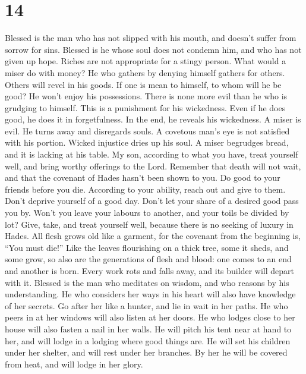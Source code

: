 \hypertarget{section-11}{%
\section{14}\label{section-11}}

 Blessed is the man who has not slipped with his mouth, and
doesn't suffer from sorrow for sins.  Blessed is he whose
soul does not condemn him, and who has not given up hope. 
Riches are not appropriate for a stingy person. What would a miser do
with money?  He who gathers by denying himself gathers for
others. Others will revel in his goods.  If one is mean to
himself, to whom will he be good? He won't enjoy his possessions.
 There is none more evil than he who is grudging to himself.
This is a punishment for his wickedness.  Even if he does
good, he does it in forgetfulness. In the end, he reveals his
wickedness.  A miser is evil. He turns away and disregards
souls.  A covetous man's eye is not satisfied with his
portion. Wicked injustice dries up his soul.  A miser
begrudges bread, and it is lacking at his table.  My son,
according to what you have, treat yourself well, and bring worthy
offerings to the Lord.  Remember that death will not wait,
and that the covenant of Hades hasn't been shown to you. 
Do good to your friends before you die. According to your ability, reach
out and give to them.  Don't deprive yourself of a good
day. Don't let your share of a desired good pass you by. 
Won't you leave your labours to another, and your toils be divided by
lot?  Give, take, and treat yourself well, because there is
no seeking of luxury in Hades.  All flesh grows old like a
garment, for the covenant from the beginning is, ``You must die!''
 Like the leaves flourishing on a thick tree, some it
sheds, and some grow, so also are the generations of flesh and blood:
one comes to an end and another is born.  Every work rots
and falls away, and its builder will depart with it. 
Blessed is the man who meditates on wisdom, and who reasons by his
understanding.  He who considers her ways in his heart will
also have knowledge of her secrets.  Go after her like a
hunter, and lie in wait in her paths.  He who peers in at
her windows will also listen at her doors.  He who lodges
close to her house will also fasten a nail in her walls. 
He will pitch his tent near at hand to her, and will lodge in a lodging
where good things are.  He will set his children under her
shelter, and will rest under her branches.  By her he will
be covered from heat, and will lodge in her glory.

